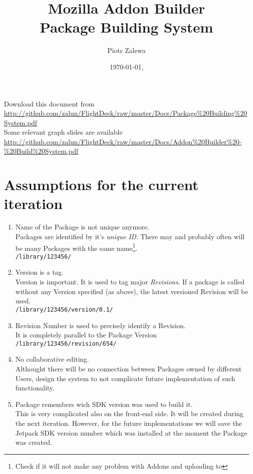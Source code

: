 \documentclass[10pt]{article}
\title{Mozilla Addon Builder\\ Package Building System}
\author{Piotr Zalewa}
\date{\today, \version}
\begin{document}
\maketitle

{\scriptsize
	\noindent Download this document from \\
\url{http://github.com/zalun/FlightDeck/raw/master/Docs/Package%20Building%20System.pdf}\\
}{\scriptsize
	\noindent Some relevant graph slides are available \\
	\url{http://github.com/zalun/FlightDeck/raw/master/Docs/Addon%20Builder%20-%20Build%20System.pdf}
}

\section{Assumptions for the current iteration}

	\begin{enumerate}
		\item{Name of the Package is not unique anymore.\\
			Packages are identified by it's {\em unique ID}. There may and probably often will be many
			Packages with the same name\footnote{Check if it will not make any problem with Addons and 
			uploading to \amo}.\\
			{\tt /library/123456/}}
		\item{Version is a tag.\\
			Version is important. It is used to tag major {\em Revisions}. If a package is called without any
			Version specified (as above), the latest versioned Revision will be used.\\
			{\tt /library/123456/version/0.1/}}
		\item{Revision Number is used to precisely identify a Revision.\\
			It is completely parallel to the Package Version\\
			{\tt /library/123456/revision/654/}}
		\item{No collaborative editing.\\
			Althought there will be no connection between Packages owned by different Users, design the 
			system to not complicate future implementation of such functionality.}
		\item{Package remembers wich SDK version was used to build it.\\
			This is very complicated also on the front-end side. It will be created during the next
			iteration. However, for the future implementations we will save the Jetpack SDK version number 
			which was installed at the moment the Package was created.}
	\end{enumerate}
\end{document}
